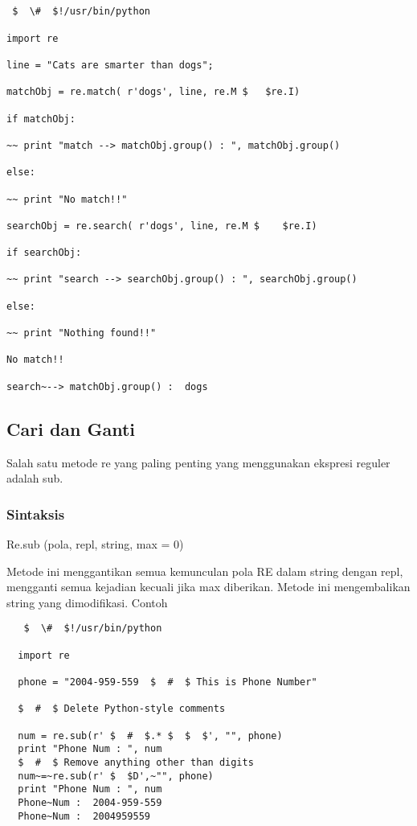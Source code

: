 \begin{enumerate}
\begin{enumerate}
\begin{verbatim}


 $  \#  $!/usr/bin/python

import re

line = "Cats are smarter than dogs";

matchObj = re.match( r'dogs', line, re.M $   $re.I)

if matchObj:

~~ print "match --> matchObj.group() : ", matchObj.group()

else:

~~ print "No match!!"

searchObj = re.search( r'dogs', line, re.M $    $re.I)

if searchObj:

~~ print "search --> searchObj.group() : ", searchObj.group()

else:

~~ print "Nothing found!!"

No match!!

search~--> matchObj.group() :  dogs
\end{verbatim}


\subsection{Cari dan Ganti}
Salah satu metode re yang paling penting yang menggunakan ekspresi reguler adalah sub.

  \subsubsection{Sintaksis}
  Re.sub (pola, repl, string, max = 0)

  Metode ini menggantikan semua kemunculan pola RE dalam string dengan repl, mengganti semua kejadian kecuali jika max diberikan. Metode ini mengembalikan string yang dimodifikasi.
  Contoh
  \begin{verbatim}
   $  \#  $!/usr/bin/python

  import re

  phone = "2004-959-559  $  #  $ This is Phone Number"

  $  #  $ Delete Python-style comments

  num = re.sub(r' $  #  $.* $  $  $', "", phone)
  print "Phone Num : ", num
  $  #  $ Remove anything other than digits
  num~=~re.sub(r' $  $D',~"", phone)
  print "Phone Num : ", num
  Phone~Num :  2004-959-559
  Phone~Num :  2004959559
  \end{verbatim}

\end{enumerate}
\end{enumerate}
